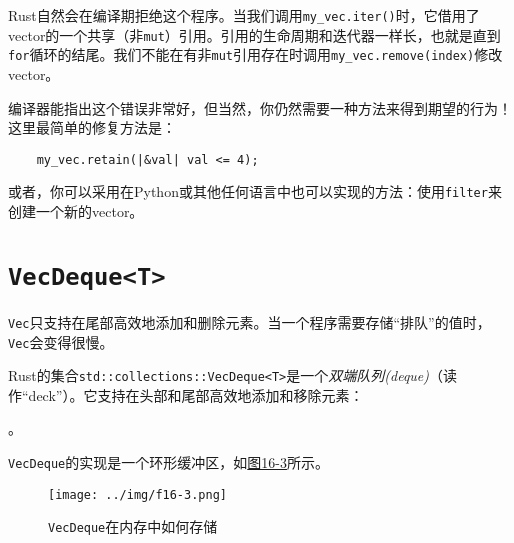 Rust自然会在编译期拒绝这个程序。当我们调用\texttt{my\_vec.iter()}时，它借用了vector的一个共享（非\texttt{mut}）引用。引用的生命周期和迭代器一样长，也就是直到\texttt{for}循环的结尾。我们不能在有非\texttt{mut}引用存在时调用\texttt{my\_vec.remove(index)}修改vector。

编译器能指出这个错误非常好，但当然，你仍然需要一种方法来得到期望的行为！这里最简单的修复方法是：
\begin{verbatim}
    my_vec.retain(|&val| val <= 4);
\end{verbatim}

或者，你可以采用在Python或其他任何语言中也可以实现的方法：使用\texttt{filter}来创建一个新的vector。

\section{\texttt{VecDeque<T>}}

\texttt{Vec}只支持在尾部高效地添加和删除元素。当一个程序需要存储“排队”的值时，\texttt{Vec}会变得很慢。

Rust的集合\texttt{std::collections::VecDeque<T>}是一个\emph{双端队列(deque)}（读作“deck”）。它支持在头部和尾部高效地添加和移除元素：






。

\texttt{VecDeque}的实现是一个环形缓冲区，如\hyperref[f16-3]{图16-3}所示。

\begin{figure}[htbp]
    \centering
    \texttt{[image: ../img/f16-3.png]}
    \caption{\texttt{VecDeque}在内存中如何存储}
    \label{f16-3}
\end{figure}


